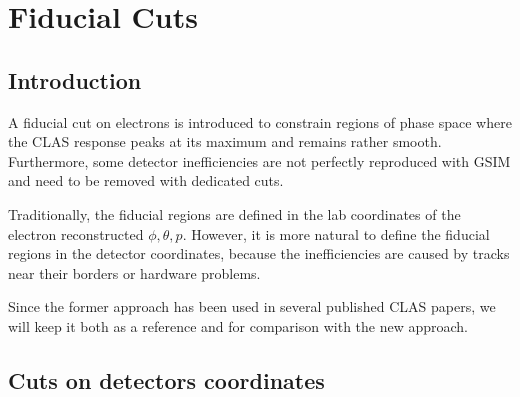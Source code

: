 \section{Fiducial Cuts}




\subsection{Introduction}

A fiducial cut on electrons is introduced to constrain regions of phase space
where the CLAS response peaks at its maximum and remains rather smooth.
Furthermore, some detector inefficiencies are not perfectly reproduced with GSIM and need to be
removed with dedicated cuts.

Traditionally, the fiducial regions are defined in the lab coordinates of the electron reconstructed $\phi, \theta, p$.
However, it is more natural to define the fiducial regions in the detector coordinates, because
the inefficiencies are caused by tracks near their borders or hardware problems.

Since the former approach has been used in several published CLAS papers, we will keep it both as a reference
and for comparison with the new approach.









\subsection{Cuts on detectors coordinates}






